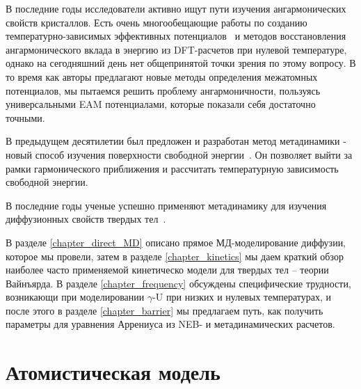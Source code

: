 \documentclass[master,14pt,subf,href,colorlinks=true
]{disser}
\begin{document}
В последние годы исследователи активно ищут пути изучения ангармонических свойств кристаллов. Есть очень многообещающие работы по созданию температурно-зависимых эффективных потенциалов~\cite{Hellman_Abrikosov_2013} и методов восстановления ангармонического вклада в энергию из DFT-расчетов при нулевой температуре\cite{Glensk_Breakdown_2014, Glensk_Understanding_anharmonicity_2015}, однако на сегодняшний день нет общепринятой точки зрения по этому вопросу. В то время как авторы предлагают новые методы определения межатомных потенциалов, мы пытаемся решить проблему ангармоничности, пользуясь универсальными EAM потенциалами, которые показали себя достаточно точными.

В предыдущем десятилетии был предложен и разработан метод метадинамики - новый способ изучения поверхности свободной энергии~\cite{Metadynamics_2005, Metadynamics_2006, Metadynamics_2008}. Он позволяет выйти за рамки гармонического приближения и рассчитать температурную зависимость свободной энергии.

В последние годы ученые успешно применяют метадинамику для изучения диффузионных свойств твердых тел~\cite{Aschauer_2009, Kozma_2012, Rabone_2015_1, Rabone_2015_2}.

В разделе \ref{chapter_direct_MD} описано прямое МД-моделирование диффузии, которое мы провели, затем в разделе \ref{chapter_kinetics} мы даем краткий обзор наиболее часто применяемой кинетическо модели для твердых тел -- теории Вайнъярда. В разделе \ref{chapter_frequency} обсуждены специфические трудности, возникающи при моделировании $\gamma$-U при низких и нулевых температурах, и после этого в разделе \ref{chapter_barrier} мы предлагаем путь, как получить параметры для уравнения Аррениуса из NEB- и метадинамических расчетов.

\section{Атомистическая модель}\label{chapter_atomistic_model}
\end{document}
